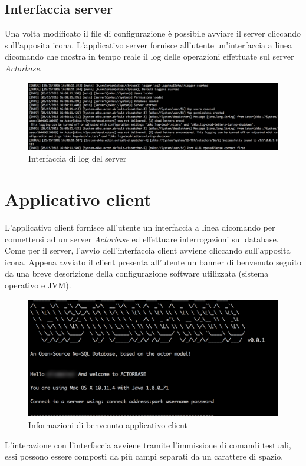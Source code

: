 \documentclass[a4paper]{article}
\begin{document}
	\subsection{Interfaccia server}
	Una volta modificato il file di configurazione è possibile avviare il server cliccando sull'apposita icona. L'applicativo server fornisce all'utente un'interfaccia a linea dicomando che mostra in tempo reale il log delle operazioni effettuate sul server \emph{Actorbase}.  
	\begin{figure}[H]
		\centering
		\includegraphics[width=\textwidth]{logServer.png}
		\caption{Interfaccia di log del server}
	\end{figure}
	\newpage
	

	\section{Applicativo client}
	L'applicativo client fornisce all'utente un interfaccia a linea dicomando per connettersi ad un server \emph{Actorbase} ed effettuare interrogazioni sul database. Come per il server, l'avvio dell'interfaccia client avviene cliccando sull'apposita icona. Appena avviato il client presenta all'utente un banner di benvenuto seguito da una breve descrizione della configurazione software utilizzata (sistema operativo e JVM).
	\begin{figure}[H]
		\centering
		\includegraphics[width=\textwidth]{welcomeClient.png}
		\caption{Informazioni di benvenuto applicativo client}
	\end{figure}
	L'interazione con l'interfaccia avviene tramite l'immissione di comandi testuali, essi possono essere composti da più campi separati da un carattere di spazio.
	
\end{document}
